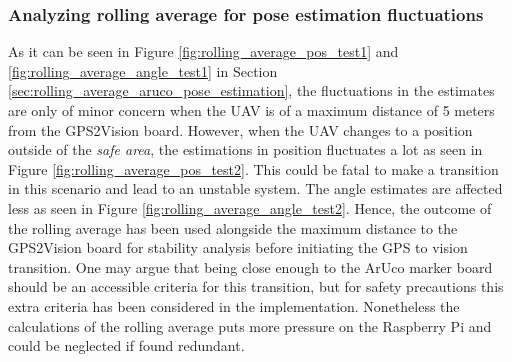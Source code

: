 \documentclass[../Head/report.tex]{subfiles}
\begin{document}
\subsubsection*{Analyzing rolling average for pose estimation fluctuations}
As it can be seen in Figure \ref{fig:rolling_average_pos_test1} and \ref{fig:rolling_average_angle_test1} in Section \ref{sec:rolling_average_aruco_pose_estimation}, the fluctuations in the estimates are only of minor concern when the UAV is of a maximum distance of 5 meters from the GPS2Vision board. However, when the UAV changes to a position outside of the \textit{safe area}, the estimations in position fluctuates a lot as seen in Figure \ref{fig:rolling_average_pos_test2}. This could be fatal to make a transition in this scenario and lead to an unstable system. The angle estimates are affected less as seen in Figure \ref{fig:rolling_average_angle_test2}. Hence, the outcome of the rolling average has been used alongside the maximum distance to the GPS2Vision board for stability analysis before initiating the GPS to vision transition. One may argue that being close enough to the ArUco marker board should be an accessible criteria for this transition, but for safety precautions this extra criteria has been considered in the implementation. Nonetheless the calculations of the rolling average puts more pressure on the Raspberry Pi and could be neglected if found redundant.     
\end{document}
